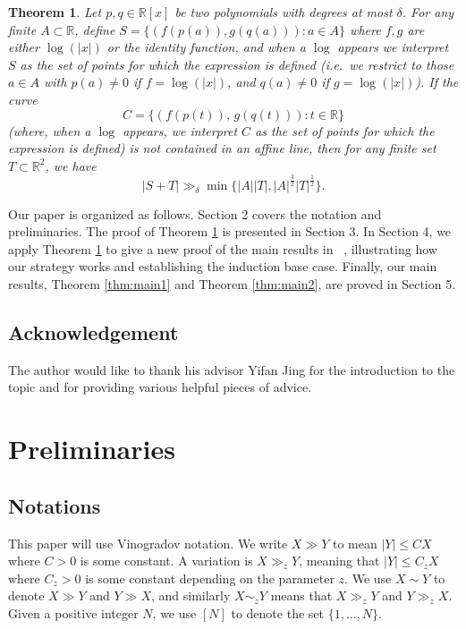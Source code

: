 \documentclass[12pt,reqno]{amsart}
\numberwithin{equation}{section}
\newtheorem{theorem}{Theorem}[section]
\begin{document}
\begin{theorem}\label{thm:enr}
	Let $p,q\in \mathbb{R}[x]$ be two polynomials with degrees at most $\delta$. For any finite $A\subset \mathbb{R}$, define
	$S=\{(f( p(a)),g(q(a))):a\in A\}$
	where $f,g$ are either $\log(|x|)$ or the identity function, and when a $\log$ appears we interpret $S$ as the set of points for which the expression is defined (i.e.\ we restrict to those $a\in A$ with $p(a)\neq 0$ if $f=\log(|x|)$, and $q(a)\neq 0$ if $g=\log(|x|)$).
	If the curve
\[
C = \{(f(p(t)),\, g(q(t))) : t \in \mathbb{R}\}
\]
(where, when a $\log$ appears, we interpret $C$ as the set of points for which the expression is defined)
is not contained in an affine line,
 then  for any finite set $T\subset\mathbb{R}^2$, we have
 \[
 |S+T|\gg_{\delta } \min\{|A||T|,|A|^{\frac{3}{2}}|T|^{\frac{1}{2}}\} .
 \]
\end{theorem}





Our paper is organized as follows. Section 2 covers the notation and preliminaries. The proof of Theorem \ref{thm:enr} is presented in Section 3. In Section 4, we apply Theorem \ref{thm:enr} to give a new proof of the main results in ~\cite{jing2022semialgebraic}, illustrating how our strategy works and establishing the induction base case. Finally, our main results, Theorem \ref{thm:main1} and Theorem \ref{thm:main2}, are proved in Section 5.

\subsection*{Acknowledgement} The author would like to thank his advisor Yifan Jing for the introduction to the topic and for providing various helpful pieces of advice.

\section{Preliminaries}
\subsection{Notations} This paper will use Vinogradov notation. We write $X\gg Y$ to mean $|Y| \leq C X$ where $C>0$ is some constant. A variation is $X\gg_z Y$, meaning that $|Y| \leq C_z X$ where $C_z>0$ is some constant depending on the parameter $z$.  We use  $X\sim Y$ to denote $X\gg Y$ and $Y\gg X$, and similarly $X\sim_{z} Y$ means that $X\gg_{z} Y$ and $Y\gg_{z} X$.  Given a positive integer $N$, we use $[N]$ to denote the set $\{1, \ldots, N\}$.
\end{document}

